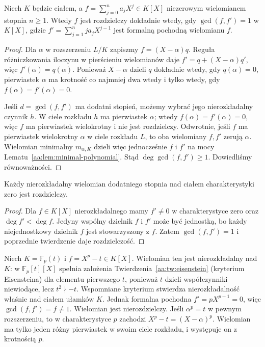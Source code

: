 \begin{twierdzenie}
\label{aa:tw:separability-derivative}
Niech $K$ będzie ciałem, a $f=\sum_{j=0}^n a_jX^j\in K[X]$
niezerowym wielomianem stopnia $n\ge1$.
Wtedy $f$ jest rozdzielczy dokładnie wtedy, gdy
$\gcd(f,f')=1$ w $K[X]$, gdzie
$f'=\sum_{j=1}^n ja_jX^{j-1}$ jest formalną
pochodną wielomianu $f$.
\end{twierdzenie}
\begin{proof}
Dla $\alpha$ w rozszerzeniu $L/K$ zapiszmy
$f=(X-\alpha)q$. Reguła różniczkowania iloczynu
w pierścieniu wielomianów daje
$f'=q+(X-\alpha)q'$, więc $f'(\alpha)=q(\alpha)$.
Ponieważ $X-\alpha$ dzieli $q$ dokładnie wtedy,
gdy $q(\alpha)=0$, pierwiastek $\alpha$ ma krotność
co najmniej dwa wtedy i tylko wtedy, gdy
$f(\alpha)=f'(\alpha)=0$.

Jeśli $d=\gcd(f,f')$ ma dodatni stopień,
możemy wybrać jego nierozkładalny czynnik $h$.
W ciele rozkładu $h$ ma pierwiastek $\alpha$;
wtedy $f(\alpha)=f'(\alpha)=0$, więc $f$
ma pierwiastek wielokrotny i nie jest rozdzielczy.
Odwrotnie, jeśli $f$ ma pierwiastek wielokrotny
$\alpha$ w ciele rozkładu $L$, to oba wielomiany
$f,f'$ zerują $\alpha$. Wielomian minimalny
$m_{\alpha,K}$ dzieli więc jednocześnie $f$ i $f'$
na mocy Lematu~\ref{aa:lem:minimal-polynomial}.
Stąd $\deg\gcd(f,f')\ge1$. Dowiedliśmy równoważności.
\end{proof}

\begin{wniosek}
\label{aa:wn:charzero-separable}
Każdy nierozkładalny wielomian dodatniego stopnia
nad ciałem charakterystyki zero jest rozdzielczy.
\end{wniosek}
\begin{proof}
Dla $f\in K[X]$ nierozkładalnego mamy
$f'\ne0$ w charakterystyce zero oraz
$\deg f'<\deg f$. Jedyny wspólny dzielnik
$f$ i $f'$ może być jednostką, bo każdy
niejednostkowy dzielnik $f$ jest stowarzyszony z $f$.
Zatem $\gcd(f,f')=1$ i poprzednie twierdzenie daje
rozdzielczość.
\end{proof}

\begin{przyklad}
\label{aa:prz:inseparable-example}
Niech $K=\mathbb F_p(t)$ i $f=X^p-t\in K[X]$.
Wielomian ten jest nierozkładalny nad $K$:
w $\mathbb F_p[t][X]$ spełnia założenia
Twierdzenia~\ref{aa:tw:eisenstein} (kryterium Eisensteina)
dla elementu pierwszego $t$, ponieważ $t$
dzieli współczynniki niewiodące, lecz $t^2\nmid -t$.
Wspomniane kryterium stwierdza nierozkładalność
właśnie nad ciałem ułamków $K$.
Jednak formalna pochodna $f'=pX^{p-1}=0$,
więc $\gcd(f,f')=f\ne1$. Wielomian jest
nierozdzielczy. Jeśli $\alpha^p=t$ w pewnym
rozszerzeniu, to w charakterystyce $p$ zachodzi
$X^p-t=(X-\alpha)^p$. Wielomian ma tylko jeden
różny pierwiastek w swoim ciele rozkładu,
i występuje on z krotnością $p$.
\end{przyklad}

